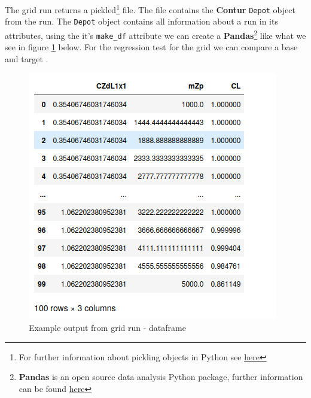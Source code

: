 The grid run returns a pickled\footnote{For further information about pickling objects in Python see \href{https://docs.python.org/3/library/pickle.html}{here}}  file. The  file contains the \textbf{Contur} \texttt{Depot} object from the run. The \texttt{Depot} object contains all information about a run in its attributes, using the it's \texttt{make\_df} attribute we can create a \textbf{Pandas}\footnote{\textbf{Pandas} is an open source data analysis Python package, further information can be found \href{https://pandas.pydata.org}{here} }  like what we see in figure \ref{fig:contur_df_output} below. For the regression test for the grid we can compare a base and target .

\begin{figure}[H]
\centering
\includegraphics[scale=0.6]{plots/example_data_frame.png}
\caption{Example output from grid run - dataframe}
\label{fig:contur_df_output}
\end{figure}


